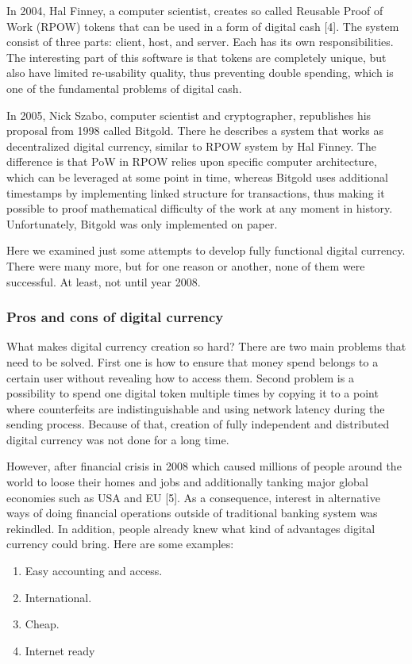 \documentclass[conference,compsoc]{IEEEtran}
\begin{document}
In 2004, Hal Finney, a computer scientist, creates so called Reusable Proof of Work (RPOW) tokens that can be used in a form of digital cash [4]. 
The system consist of three parts: client, host, and server. Each has its own responsibilities. 
The interesting part of this software is that tokens are completely unique, but also have limited re-usability quality, thus preventing double spending, which is one of the fundamental problems of digital cash. 

In 2005, Nick Szabo, computer scientist and cryptographer, republishes his proposal from 1998 called Bitgold. 
There he describes a system that works as decentralized digital currency, similar to RPOW system by Hal Finney. 
The difference is that PoW in RPOW relies upon specific computer architecture, which can be leveraged at some point in time, whereas Bitgold uses additional timestamps by implementing linked structure for transactions, thus making it possible to proof mathematical difficulty of the work at any moment in history. 
Unfortunately, Bitgold was only implemented on paper.

Here we examined just some attempts to develop fully functional digital currency. 
There were many more, but for one reason or another, none of them were successful. 
At least, not until year 2008. 

\subsubsection{Pros and cons of digital currency}
What makes digital currency creation so hard? There are two main problems that need to be solved. 
First one is how to ensure that money spend belongs to a certain user without revealing how to access them. 
Second problem is a possibility to spend one digital token multiple times by copying it to a point where counterfeits are indistinguishable and using network latency during the sending process. 
Because of that, creation of fully independent and distributed digital currency was not done for a long time. 

However, after financial crisis in 2008 which caused millions of people around the world to loose their homes and jobs and additionally tanking major global economies such as USA and EU [5].
As a consequence, interest in alternative ways of doing financial operations outside of traditional banking system was rekindled. 
In addition, people already knew what kind of advantages digital currency could bring. Here are some examples:
\begin{enumerate}
  \item Easy accounting and access. 
  \item International. 
  \item Cheap. 
  \item Internet ready
\end{enumerate}
\end{document}
